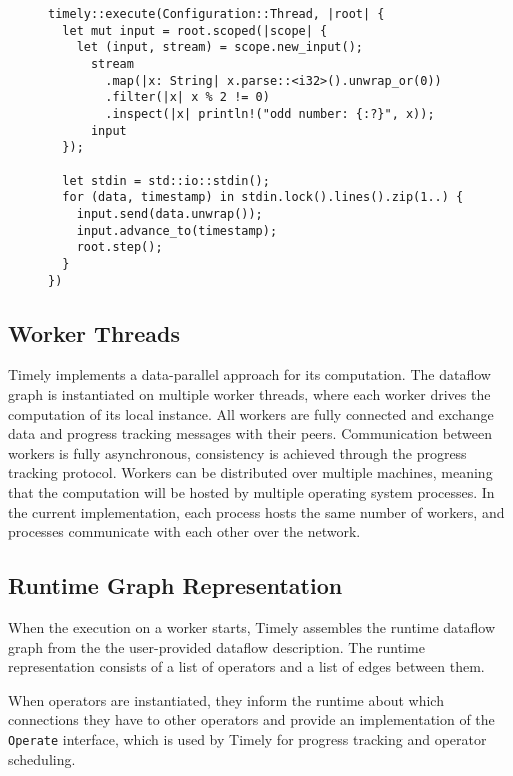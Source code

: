 \begin{figure}
\begin{lstlisting}[caption={[Example program in Timely Dataflow]A simple 
single-threaded example program which reads lines from standard input,
converts them into integers and filters out odd numbers.}]
timely::execute(Configuration::Thread, |root| {
  let mut input = root.scoped(|scope| {
    let (input, stream) = scope.new_input();
      stream
        .map(|x: String| x.parse::<i32>().unwrap_or(0))
        .filter(|x| x % 2 != 0)
        .inspect(|x| println!("odd number: {:?}", x));
      input
  });

  let stdin = std::io::stdin();
  for (data, timestamp) in stdin.lock().lines().zip(1..) {
    input.send(data.unwrap());
    input.advance_to(timestamp);
    root.step();
  }
})
\end{lstlisting}
\end{figure}

\subsection{Worker Threads}

Timely implements a data-parallel approach for its computation. The dataflow graph
is instantiated on multiple worker threads, where each worker
drives the computation of its local instance. All workers are fully connected
and exchange data and progress tracking messages with their peers. Communication
between workers is fully asynchronous, consistency is achieved through the
progress tracking protocol. Workers can be distributed over multiple
machines, meaning that the computation will be hosted by multiple operating
system processes.
In the current implementation, each process hosts the same number of
workers, and processes communicate with each other over the network.

\subsection{Runtime Graph Representation} \label{sec:runtime-graph}

When the execution on a worker starts, Timely assembles the runtime
dataflow graph from the the user-provided dataflow description. The runtime
representation consists of a list of operators and a list of edges between them.

When operators are instantiated, they inform the runtime about which
connections they have to other operators and provide an implementation
of the \lstinline{Operate} interface, which is used by Timely for progress
tracking and operator scheduling.

